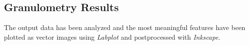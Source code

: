 \documentclass{article}
\begin{document}
    \clearpage

    \subsection{Granulometry Results\label{Granulometry_results}}
      
      The output data has been analyzed and the most meaningful features have been plotted as vector images using \textit{Labplot} and 
      postprocessed with \textit{Inkscape}. \\ 
  
\end{document}
